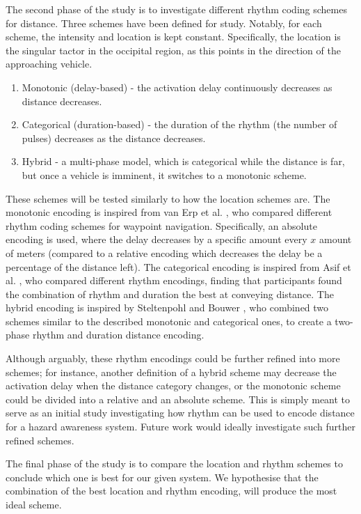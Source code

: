\documentclass{interim}
\begin{document}
The second phase of the study is to investigate different rhythm coding schemes for distance. Three schemes have been defined for study. Notably, for each scheme, the intensity and location is kept constant. Specifically, the location is the singular tactor in the occipital region, as this points in the direction of the approaching vehicle.
\begin{enumerate}
    \item Monotonic (delay-based) - the activation delay continuously decreases as distance decreases.
    \item Categorical (duration-based) - the duration of the rhythm (the number of pulses) decreases as the distance decreases.
    \item Hybrid - a multi-phase model, which is categorical while the distance is far, but once a vehicle is imminent, it switches to a monotonic scheme.
\end{enumerate}
These schemes will be tested similarly to how the location schemes are. The monotonic encoding is inspired from van Erp et al. \cite{10.1145/1060581.1060585}, who compared different rhythm coding schemes for waypoint navigation. Specifically, an absolute encoding is used, where the delay decreases by a specific amount every $x$ amount of meters (compared to a relative encoding which decreases the delay be a percentage of the distance left). The categorical encoding is inspired from Asif et al. \cite{10.1145/1868914.1868923}, who compared different rhythm encodings, finding that participants found the combination of rhythm and duration the best at conveying distance. The hybrid encoding is inspired by Steltenpohl and Bouwer \cite{10.1145/2449396.2449450}, who combined two schemes similar to the described monotonic and categorical ones, to create a two-phase rhythm and duration distance encoding.

Although arguably, these rhythm encodings could be further refined into more schemes; for instance, another definition of a hybrid scheme may decrease the activation delay when the distance category changes, or the monotonic scheme could be divided into a relative and an absolute scheme. This is simply meant to serve as an initial study investigating how rhythm can be used to encode distance for a hazard awareness system. Future work would ideally investigate such further refined schemes.

The final phase of the study is to compare the location and rhythm schemes to conclude which one is best for our given system. We hypothesise that the combination of the best location and rhythm encoding, will produce the most ideal scheme.
\end{document}
